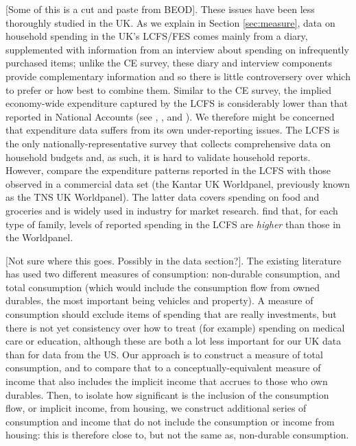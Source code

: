 [Some of this is a cut and paste from BEOD]. These issues have been less thoroughly studied in the UK. As we explain in Section \ref{sec:measure}, data on household spending in the UK's LCFS/FES comes mainly from a diary, supplemented with information from an interview about spending on infrequently purchased items; unlike the CE survey, these diary and interview components provide complementary information and so there is little controversery over which to prefer or how best to combine them. Similar to the CE survey, the implied economy-wide expenditure captured by the LCFS is considerably lower than that reported in National Accounts (see \citealp{Deaton2005}, \citealp{Attanasio2006}, \citealp{Crossley2010} and \citet{Barrettetal2014}). We therefore might be concerned that expenditure data suffers from
its own under-reporting issues. The LCFS is the only nationally-representative
survey that collects comprehensive data on household budgets and,
as such, it is hard to validate household reports. However, \citet{LeicesterOldfield2009}
compare the expenditure patterns reported in the LCFS with those observed
in a commercial data set (the Kantar UK Worldpanel, previously known
as the TNS UK Worldpanel). The latter data covers spending on food
and groceries and is widely used in industry for market research.
\citet{LeicesterOldfield2009} find that, for each type of family,
levels of reported spending in the LCFS are \textit{higher} than those
in the Worldpanel.  

[Not sure where this goes. Possibly in the data section?]. The existing literature has used two different measures of consumption: non-durable consumption, and total consumption (which would include the consumption flow from owned durables, the most important being vehicles and property). A measure of consumption should exclude items of spending that are really investments, but there is not yet consistency over how to treat (for example) spending on medical care or education, although these are both a lot less important for our UK data than for data from the US. Our approach is to construct a measure of total consumption, and to compare that to a conceptually-equivalent measure of income that also includes the implicit income that accrues to those who own durables. Then, to isolate how significant is the inclusion of the consumption flow, or implicit income, from housing, we construct additional series of consumption and income that do not include the consumption or income from housing: this is therefore close to, but not the same as, non-durable consumption.

